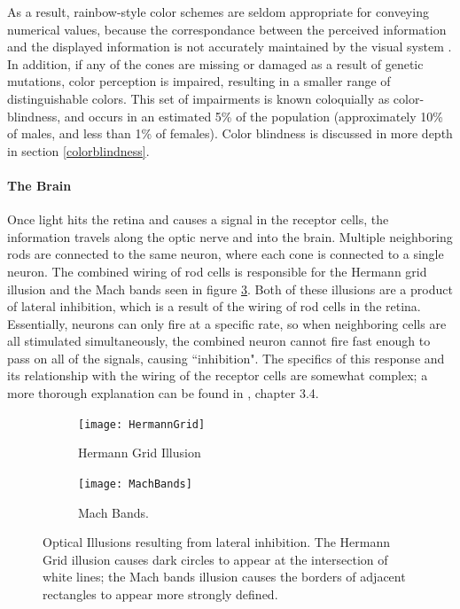 \documentclass[11pt]{isuthesis}\usepackage[]{graphicx}\usepackage[]{color}
\begin{document}
As a result, rainbow-style color schemes are seldom appropriate for conveying numerical values, because the correspondance between the perceived information and the displayed information is not accurately maintained by the visual system \citep{rainbowcolor}. In addition, if any of the cones are missing or damaged as a result of genetic mutations, color perception is impaired, resulting in a smaller range of distinguishable colors. This set of impairments is known coloquially as color-blindness, and occurs in an estimated 5\% of the population (approximately 10\% of males, and less than 1\% of females). Color blindness is discussed in more depth in section \ref{colorblindness}. 

\paragraph{The Brain}
Once light hits the retina and causes a signal in the receptor cells, the information travels along the optic nerve and into the brain. Multiple neighboring rods are connected to the same neuron, where each cone is connected to a single neuron. The combined wiring of rod cells is responsible for the Hermann grid illusion and the Mach bands seen in figure \ref{fig:InhibitionIllusions}. Both of these illusions are a product of lateral inhibition, which is a result of the wiring of rod cells in the retina. Essentially, neurons can only fire at a specific rate, so when neighboring cells are all stimulated simultaneously, the combined neuron cannot fire fast enough to pass on all of the signals, causing ``inhibition". The specifics of this response and its relationship with the wiring of the receptor cells are somewhat complex; a more thorough explanation can be found in \citet{goldstein}, chapter 3.4. 

\begin{figure}
\centering
\begin{subfigure}[b]{.45\linewidth}
  \centering
  \texttt{[image: HermannGrid]}
  \caption{\small Hermann Grid Illusion \label{fig:hermanngrid}}
\end{subfigure}\hfill
\begin{subfigure}[b]{.45\linewidth}
  \centering
  \texttt{[image: MachBands]}
  \caption{\small Mach Bands. 
  \label{fig:machbands}}
\end{subfigure}
\caption[Inhibition Illusions]{Optical Illusions resulting from lateral inhibition. The Hermann Grid illusion causes dark circles to appear at the intersection of white lines; the Mach bands illusion causes the borders of adjacent rectangles to appear more strongly defined.} \label{fig:InhibitionIllusions}
\end{figure}
\end{document}
